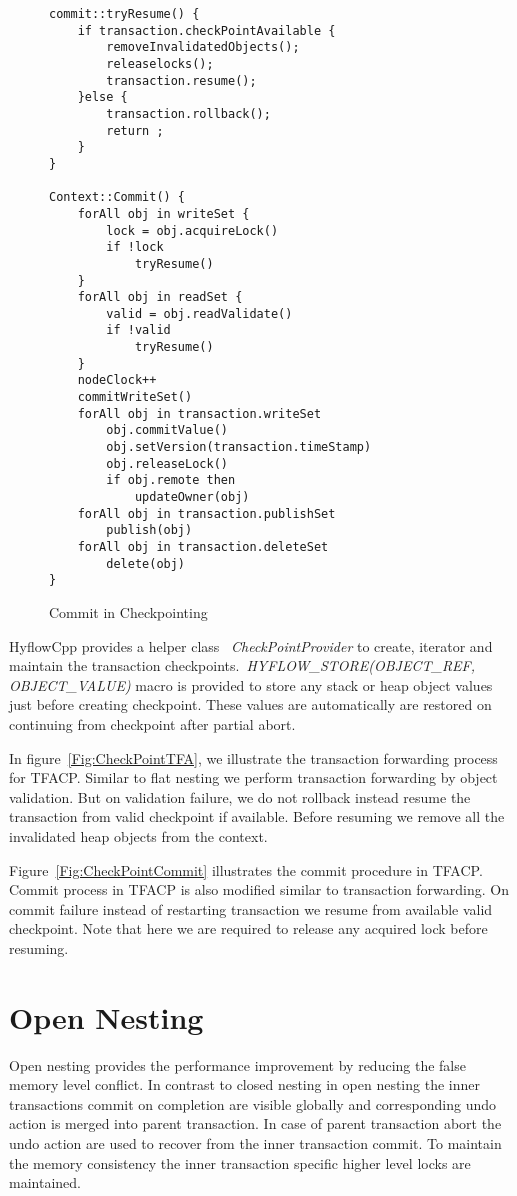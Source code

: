 \documentclass[12pt,english]{report}
\begin{document}
\begin{figure}
\begin{minipage}[b]{0.9\linewidth}\centering
\begin{lstlisting}
commit::tryResume() {
	if transaction.checkPointAvailable {
		removeInvalidatedObjects();
		releaselocks();
		transaction.resume();
	}else {
		transaction.rollback();
		return ;
	}		
}

Context::Commit() {
	forAll obj in writeSet {
		lock = obj.acquireLock()
		if !lock
			tryResume()
	}
	forAll obj in readSet {
		valid = obj.readValidate()
		if !valid
			tryResume()
	}
	nodeClock++
	commitWriteSet()
	forAll obj in transaction.writeSet
		obj.commitValue()
 		obj.setVersion(transaction.timeStamp)
 		obj.releaseLock()
 		if obj.remote then
 			updateOwner(obj)
	forAll obj in transaction.publishSet
		publish(obj)
	forAll obj in transaction.deleteSet
		delete(obj)
}
\end{lstlisting}
\end{minipage}
\caption{Commit in Checkpointing}
\label{Fig:CheckpointCommit}
\end{figure}

HyflowCpp provides a helper class ~\emph{CheckPointProvider} to create, iterator and maintain the transaction checkpoints.~\emph{HYFLOW{\_}STORE(OBJECT{\_}REF, OBJECT{\_}VALUE)} macro is provided to store any stack or heap object values just before creating checkpoint. These values are automatically are restored on continuing from checkpoint after partial abort.     

In figure~\ref{Fig:CheckPointTFA}, we illustrate the transaction forwarding process for TFACP. Similar to flat nesting we perform transaction forwarding by object validation. But on validation failure, we do not rollback instead resume the transaction from valid checkpoint if available. Before resuming we remove all the invalidated heap objects from the context.

Figure~\ref{Fig:CheckPointCommit} illustrates the commit procedure in TFACP. Commit process in TFACP is also modified similar to transaction forwarding. On commit failure instead of restarting transaction we resume from available valid checkpoint. Note that here we are required to release any acquired lock before resuming. 

\section{Open Nesting}

Open nesting provides the performance improvement by reducing the false memory level conflict. In contrast to closed nesting in open nesting the inner transactions commit on completion are visible globally and corresponding undo action is merged into parent transaction. In case of parent transaction abort the undo action are used to recover from the inner transaction commit. To maintain the memory consistency the inner transaction specific higher level locks are maintained.  
\end{document}
